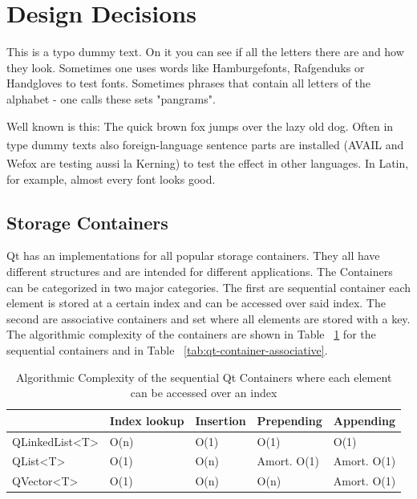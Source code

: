 \section{Design Decisions}
\label{sec:typeareatest_typedummytext}

This is a typo dummy text. On it you can see if all the letters there are and how they look. Sometimes one uses words like Hamburgefonts, Rafgenduks or Handgloves to test fonts. Sometimes phrases that contain all letters of the alphabet - one calls these sets "pangrams".

Well known is this: The quick brown fox jumps over the lazy old dog. Often in type dummy texts also foreign-language sentence parts are installed (AVAIL\textsuperscript{\texttrademark} and Wefox\textsuperscript{\textregistered} are testing aussi la Kerning) to test the effect in other languages. In Latin, for example, almost every font looks good.

\subsection{Storage Containers}
\label{subsec:satzspiegeltest_typoblindtext_demonstrandum}

Qt has an implementations for all popular storage containers. They all have different structures and are intended for different applications. The Containers can be categorized in two major categories. The first are sequential container each element is stored at a certain index and can be accessed over said index. The second are associative containers and set where all elements are stored with a key. The algorithmic complexity of the  containers are shown in Table ~\ref{tab:qt-container-sequential} for the sequential containers and in Table ~\ref{tab:qt-container-associative}.


\begin{table}[!htb]
\centering

\begin{tabular}{@{}|l|l|l|l|l|@{}}
\toprule
                                  & Index lookup & Insertion & Prepending  & Appending   \\ \midrule
QLinkedList\textless T\textgreater & O(n)         & O(1)      & O(1)        & O(1)        \\ \midrule
QList\textless T\textgreater       & O(1)         & O(n)      & Amort. O(1) & Amort. O(1) \\ \midrule
QVector\textless T\textgreater     & O(1)         & O(n)      & O(n)        & Amort. O(1) \\ \bottomrule
\end{tabular}
\caption{Algorithmic Complexity of the sequential Qt Containers where each element can be accessed over an index \cite{QtDoc:Containers}}
\label{tab:qt-container-sequential}
\end{table}

